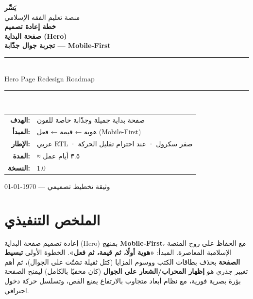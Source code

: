 \documentclass[11pt]{article}
\begin{document}
\begin{titlepage}
\centering
\vspace*{2.5cm}
{\Huge\bfseries\color{gold} يَسِّر}\\[0.4cm]
{\large\color{midgray} منصة تعليم الفقه الإسلامي}\\[2.5cm]

{\Huge\bfseries خطة إعادة تصميم}\\[0.5cm]
{\Huge\bfseries صفحة البداية (Hero)}\\[1cm]
{\LARGE\bfseries تجربة جوال جذّابة — Mobile-First}\\[1.2cm]

\rule{0.7\textwidth}{0.5pt}\\[0.8cm]
{\large Hero Page Redesign Roadmap}\\[0.8cm]
\rule{0.7\textwidth}{0.5pt}\\[2.5cm]

\begin{tabular}{r l}
\textbf{الهدف:}       & صفحة بداية جميلة وجذّابة خاصة للفون \\
\textbf{المبدأ:}      & هوية ← قيمة ← فعل (Mobile-First) \\
\textbf{الإطار:}      & عربي RTL · صفر سكرول · عند احترام تقليل الحركة \\
\textbf{المدة:}       & ≈ ٣.٥ أيام عمل \\
\textbf{النسخة:}      & 1.0 \\
\end{tabular}

\vfill
{\small\color{midgray} وثيقة تخطيط تصميمي — \today}
\end{titlepage}

\newpage
\tableofcontents
\newpage

\section{الملخص التنفيذي}

\begin{infobox}
إعادة تصميم صفحة البداية (Hero) بمنهج \textbf{Mobile-First}، مع الحفاظ على روح المنصة الإسلامية المعاصرة.
المبدأ: \textbf{«هوية أولًا، ثم قيمة، ثم فعل»}. الخطوة الأولى \textbf{تبسيط الصفحة} بحذف بطاقات الكتب ووسوم المزايا
(كتل ثقيلة تشتّت على الجوال)، ثم أهم تغيير جذري هو \textbf{إظهار المحراب/الشعار على الجوال}
(كان مخفيًا بالكامل) ليمنح الصفحة بؤرة بصرية فورية، مع نظام أبعاد متجاوب بالارتفاع يمنع القص، وتسلسل حركة دخول احترافي.
\end{infobox}
\end{document}

